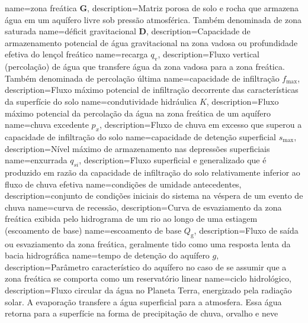 {
    name=zona freática $\textbf{G}$,
    description={Matriz porosa de solo e rocha que armazena água em um aquífero livre sob pressão atmosférica. Também denominada de zona saturada}
}
{
    name=déficit gravitacional $\textbf{D}$,
    description={Capacidade de armazenamento potencial de água gravitacional na zona vadosa ou profundidade efetiva do lençol freático}
}
{
    name=recarga $q_{\text{v}}$,
    description={Fluxo vertical (percolação) de água que transfere água da zona vadosa para a zona freática. Também denominada de percolação última}
}
{
    name=capacidade de infiltração $f_{\text{max}}$,
    description={Fluxo máximo potencial de infiltração decorrente das características da superfície do solo}
}
{
    name=condutividade hidráulica $K$,
    description={Fluxo máximo potencial da percolação da água na zona freática de um aquífero}
}
{
    name=chuva excedente $p_{x}$,
    description={Fluxo de chuva em excesso que superou a capacidade de infiltração do solo}
}
{
    name=capacidade de detenção superficial $s_{\text{max}}$,
    description={Nível máximo de armazenamento nas depressões superficiais}
}
{
    name=enxurrada $q_{si}$,
    description={Fluxo superficial e generalizado que é produzido em razão da capacidade de infiltração do solo relativamente inferior ao fluxo de chuva efetiva}
}
{
    name=condições de umidade antecedentes,
    description={conjunto de condições iniciais do sistema na véspera de um evento de chuva}
}
{
    name=curva de recessão,
    description={Curva de esvaziamento da zona freática exibida pelo hidrograma de um rio ao longo de uma estiagem (escoamento de base)}
}
{
    name=escoamento de base $Q_{\text{g}}$,
    description={Fluxo de saída ou esvaziamento da zona freática, geralmente tido como uma resposta lenta da bacia hidrográfica}
}
{
    name=tempo de detenção do aquífero $g$,
    description={Parâmetro característico do aquífero no caso de se assumir que a zona freática se comporta como um reservatório linear}
}
{
    name=ciclo hidrológico,
    description={Fluxo circular da água no Planeta Terra, energizado pela radiação solar. A evaporação transfere a água superficial para a atmosfera. Essa água retorna para a superfície na forma de precipitação de chuva, orvalho e neve}
}
